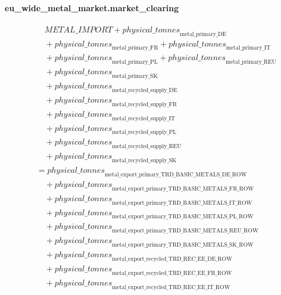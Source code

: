 \documentclass[11pt]{article}
\begin{document}
\paragraph{eu\_wide\_metal\_market.market\_clearing}
\begin{align*}
&\quad METAL\_IMPORT + {physical\_tonnes}_{\text{metal\_primary\_DE}}\\
&\quad {}+ {physical\_tonnes}_{\text{metal\_primary\_FR}} + {physical\_tonnes}_{\text{metal\_primary\_IT}}\\
&\quad {}+ {physical\_tonnes}_{\text{metal\_primary\_PL}} + {physical\_tonnes}_{\text{metal\_primary\_REU}}\\
&\quad {}+ {physical\_tonnes}_{\text{metal\_primary\_SK}}\\
&\quad {}+ {physical\_tonnes}_{\text{metal\_recycled\_supply\_DE}}\\
&\quad {}+ {physical\_tonnes}_{\text{metal\_recycled\_supply\_FR}}\\
&\quad {}+ {physical\_tonnes}_{\text{metal\_recycled\_supply\_IT}}\\
&\quad {}+ {physical\_tonnes}_{\text{metal\_recycled\_supply\_PL}}\\
&\quad {}+ {physical\_tonnes}_{\text{metal\_recycled\_supply\_REU}}\\
&\quad {}+ {physical\_tonnes}_{\text{metal\_recycled\_supply\_SK}}\\
&= {physical\_tonnes}_{\text{metal\_export\_primary\_TRD\_BASIC\_METALS\_DE\_ROW}}\\
&\quad {}+ {physical\_tonnes}_{\text{metal\_export\_primary\_TRD\_BASIC\_METALS\_FR\_ROW}}\\
&\quad {}+ {physical\_tonnes}_{\text{metal\_export\_primary\_TRD\_BASIC\_METALS\_IT\_ROW}}\\
&\quad {}+ {physical\_tonnes}_{\text{metal\_export\_primary\_TRD\_BASIC\_METALS\_PL\_ROW}}\\
&\quad {}+ {physical\_tonnes}_{\text{metal\_export\_primary\_TRD\_BASIC\_METALS\_REU\_ROW}}\\
&\quad {}+ {physical\_tonnes}_{\text{metal\_export\_primary\_TRD\_BASIC\_METALS\_SK\_ROW}}\\
&\quad {}+ {physical\_tonnes}_{\text{metal\_export\_recycled\_TRD\_REC\_EE\_DE\_ROW}}\\
&\quad {}+ {physical\_tonnes}_{\text{metal\_export\_recycled\_TRD\_REC\_EE\_FR\_ROW}}\\
&\quad {}+ {physical\_tonnes}_{\text{metal\_export\_recycled\_TRD\_REC\_EE\_IT\_ROW}}\\

\end{align*}
\end{document}
